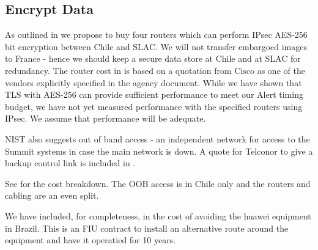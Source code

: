 \subsection{Encrypt Data} \label{sec:1encrypt}

As outlined in   we propose to buy four routers which can perform IPsec AES-256 bit encryption between Chile and SLAC.
We will not transfer embargoed images to France - hence we should keep a secure data store at Chile and at SLAC for redundancy.
The router cost in   is based on a quotation from Cisco as one of the vendors explicitly specified in the agency document.
While we have shown that TLS with AES-256 can provide sufficient performance to meet our Alert timing budget, we have not yet measured performance with the specified routers using IPsec.
We assume that performance will be adequate.

NIST also suggests out of band access - an independent network for access to the Summit systems in case the main network is down.
A quote for Telconor to give a backup control link is included in .

See  for the cost breakdown.  The OOB access is in Chile only and the routers and cabling are an even split.

We have included, for completeness, in  the cost of avoiding the huawei equipment in Brazil. This is an FIU contract to install an alternative route around the equipment and have it operatied for 10 years.



